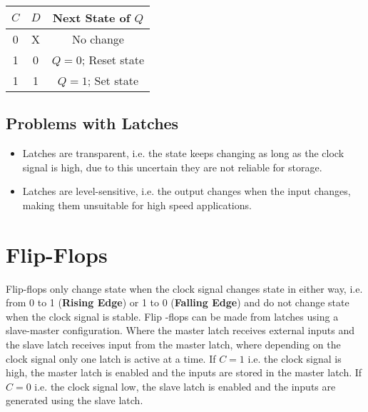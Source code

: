 \documentclass[12pt letter]{report}
\begin{document}
\begin{table}[h!]
  \begin{center}
    \begin{tabular}{|c c|c|}
      \hline
      $C$ & $D$ & Next State of $Q$    \\ [0.5ex]
      \hline
      \hline
      0   & X   & No change            \\
      1   & 0   & $Q = 0$; Reset state \\
      1   & 1   & $Q = 1$; Set state   \\
      \hline
    \end{tabular}
  \end{center}
\end{table}



\subsection{Problems with Latches}

\begin{itemize}
  \item Latches are transparent, i.e. the state keeps changing as long as the clock signal is high, due to this
        uncertain they are not reliable for storage.
  \item Latches are level-sensitive, i.e. the output changes when the input changes, making them unsuitable for high
        speed applications.
\end{itemize}

\section{Flip-Flops}


Flip-flops only change state when the clock signal changes state in either way, i.e. from 0 to 1 (\textbf{Rising Edge})
or 1 to 0 (\textbf{Falling Edge}) and do not change state when the clock signal is stable. Flip -flops can be made from
latches using a slave-master configuration. Where the master latch receives external inputs and the slave latch receives
input from the master latch, where depending on the clock signal only one latch is active at a time. If $C = 1$ i.e. the
clock signal is high, the master latch is enabled and the inputs are stored in the master latch. If $C = 0$ i.e. the
clock signal low, the slave latch is enabled and the inputs are generated using the slave latch. \\
\end{document}
